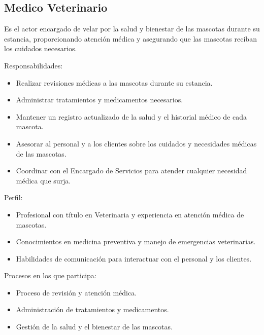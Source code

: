 \begin{Usuario}{\hypertarget{Veterinario}{\subsection{Medico Veterinario}}}{
			Es el actor encargado de velar por la salud y bienestar de las mascotas durante su estancia, proporcionando atención médica y asegurando que las mascotas reciban los cuidados necesarios.
		}
		\item[Responsabilidades:] \cdtEmpty
		\begin{itemize}
			\item Realizar revisiones médicas a las mascotas durante su estancia.
\item Administrar tratamientos y medicamentos necesarios.
\item Mantener un registro actualizado de la salud y el historial médico de cada mascota.
\item Asesorar al personal y a los clientes sobre los cuidados y necesidades médicas de las mascotas.
\item Coordinar con el Encargado de Servicios para atender cualquier necesidad médica que surja.
		\end{itemize}
		
		\item[Perfil:] \cdtEmpty
		\begin{itemize}
			\item Profesional con título en Veterinaria y experiencia en atención médica de mascotas.
		\item Conocimientos en medicina preventiva y manejo de emergencias veterinarias.
		\item Habilidades de comunicación para interactuar con el personal y los clientes.
		\end{itemize}
		\item[Procesos en los que participa:] \cdtEmpty
		\begin{itemize}
			\item Proceso de revisión y atención médica.
		\item Administración de tratamientos y medicamentos.
		\item Gestión de la salud y el bienestar de las mascotas.
		\end{itemize}
	\end{Usuario}

	
